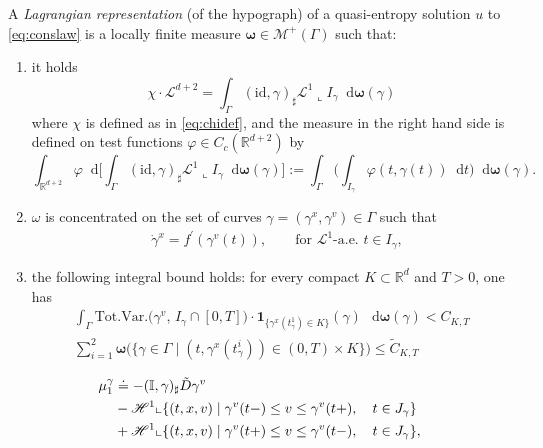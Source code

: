 \documentclass[10pt,a4paper]{amsart}
\newcommand*\dif{\mathop{}\!\mathrm{d}}
\newcommand{\bs}[1]{\boldsymbol{#1}}
\newcommand{\msc}[1]{\mathscr{#1}}
\newcommand{\wt}[1]{\widetilde{#1}}
\begin{document}
\begin{defi}\label{def:lagrangianrep}
A \textit{Lagrangian representation} (of the hypograph) of a quasi-entropy solution $u$ to \eqref{eq:conslaw} is a locally finite measure $\bs \omega \in \msc {M}^+(\Gamma)$ such that:
\begin{enumerate}
    \item it holds
    \begin{equation}\label{eq:deflagromega}
        \chi \cdot \mathscr L^{d+2} = \int_{\Gamma} (\mathrm{id}, \gamma)_{\sharp} \mathscr L^1 \llcorner I_{\gamma} \dif \bs \omega(\gamma)
    \end{equation}
    where $\chi$ is defined as in \eqref{eq:chidef}, and the measure in the right hand side is defined on test functions $\varphi \in  C_c(\mathbb R^{d+2})$ by
    $$
    \int_{\mathbb R^{d+2}} \varphi \dif \Big[ \int_{\Gamma} (\mathrm{id}, \gamma)_{\sharp} \mathscr L^1 \llcorner I_{\gamma} \dif \bs \omega(\gamma)\Big] := \int_\Gamma \Big( \int_{I_\gamma} \varphi(t,\gamma(t)) \dif t\Big) \dif \bs \omega(\gamma).
    $$
    \item $\omega$ is concentrated on the set of curves $\gamma = (\gamma^x, \gamma^v) \in \Gamma$ such that 
    \begin{equation}\label{eq:charaeqla}
    \begin{aligned}
   &  \dot{\gamma}^x = f^{\prime}(\gamma^v(t)), \qquad \text{for $\msc L^1$-a.e. $t \in I_{\gamma}$}, 
   \end{aligned}
    \end{equation}    
    \item the following integral bound holds: for every compact $K \subset \mathbb R^d$ and $T > 0$, one has
    \begin{equation}\label{eq:CKTlr}
        \begin{aligned}
     \int_{\Gamma}  \mathrm{Tot.Var.}\big(\gamma^v, \, I_\gamma \cap [0,T]\big) \cdot \mathbf 1_{\{\gamma^x(t_\gamma^1) \in K\}}(\gamma) \,\dif \bs \omega(\gamma) < C_{K,T}\\
\sum_{i=1}^2 \bs \omega \Big(\big\{ \gamma \in \Gamma \; | \; (t,\gamma^x(t^i_\gamma)) \in (0, T) \times K \big\} \Big) \leq \wt C_{K,T}
     \end{aligned}
    \end{equation}
\end{enumerate}
\end{defi}

\begin{equation}\label{eq:mu1def}
    \begin{aligned}
    \mu_1^{\gamma}& \doteq -(\mathbb I , \gamma)_{\sharp} \Tilde{D} \gamma^v \\
    & - \mathscr H^1 \llcorner \{(t,x,v) \; | \; \gamma^v(t-) \leq v \leq \gamma^v(t+), \quad t \in J_\gamma\}\\
    & +\mathscr H^1 \llcorner \{(t,x,v) \; | \; \gamma^v(t+) \leq v \leq \gamma^v(t-), \quad t \in J_\gamma\},
    \end{aligned}
 \end{equation}
\end{document}
